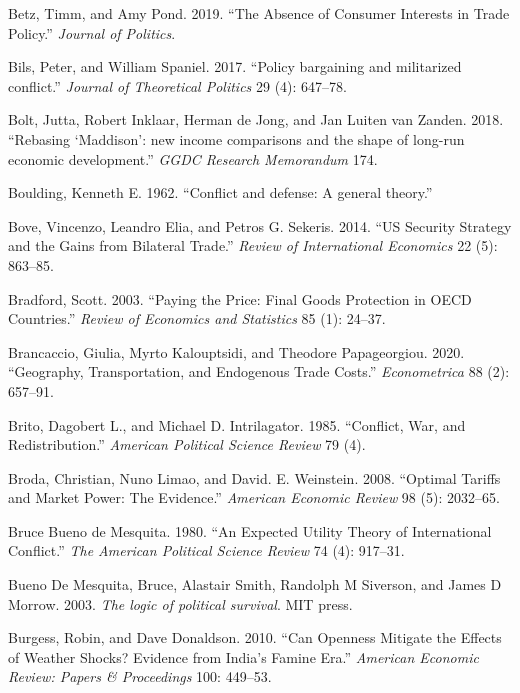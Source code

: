 \documentclass{puthesis}
\newlength{\cslhangindent}
\newenvironment{cslreferences}%
  {\setlength{\parindent}{0pt}%
  \everypar{\setlength{\hangindent}{\cslhangindent}}\ignorespaces}%
  {\par}
\begin{document}
\begin{cslreferences}
\leavevmode\hypertarget{ref-Betz2019}{}%
Betz, Timm, and Amy Pond. 2019. ``The Absence of Consumer Interests in
Trade Policy.'' \emph{Journal of Politics}.

\leavevmode\hypertarget{ref-Bils2017}{}%
Bils, Peter, and William Spaniel. 2017. ``Policy bargaining and
militarized conflict.'' \emph{Journal of Theoretical Politics} 29 (4):
647--78.

\leavevmode\hypertarget{ref-Bolt2018}{}%
Bolt, Jutta, Robert Inklaar, Herman de Jong, and Jan Luiten van Zanden.
2018. ``Rebasing `Maddison': new income comparisons and the shape of
long-run economic development.'' \emph{GGDC Research Memorandum} 174.

\leavevmode\hypertarget{ref-Boulding1962}{}%
Boulding, Kenneth E. 1962. ``Conflict and defense: A general theory.''

\leavevmode\hypertarget{ref-Bove2014}{}%
Bove, Vincenzo, Leandro Elia, and Petros G. Sekeris. 2014. ``US Security
Strategy and the Gains from Bilateral Trade.'' \emph{Review of
International Economics} 22 (5): 863--85.

\leavevmode\hypertarget{ref-Bradford2003}{}%
Bradford, Scott. 2003. ``Paying the Price: Final Goods Protection in
OECD Countries.'' \emph{Review of Economics and Statistics} 85 (1):
24--37.

\leavevmode\hypertarget{ref-Brancaccio2020}{}%
Brancaccio, Giulia, Myrto Kalouptsidi, and Theodore Papageorgiou. 2020.
``Geography, Transportation, and Endogenous Trade Costs.''
\emph{Econometrica} 88 (2): 657--91.

\leavevmode\hypertarget{ref-Brito1985}{}%
Brito, Dagobert L., and Michael D. Intrilagator. 1985. ``Conflict, War,
and Redistribution.'' \emph{American Political Science Review} 79 (4).

\leavevmode\hypertarget{ref-Broda2008}{}%
Broda, Christian, Nuno Limao, and David. E. Weinstein. 2008. ``Optimal
Tariffs and Market Power: The Evidence.'' \emph{American Economic
Review} 98 (5): 2032--65.

\leavevmode\hypertarget{ref-BuenodeMesquita1980}{}%
Bruce Bueno de Mesquita. 1980. ``An Expected Utility Theory of
International Conflict.'' \emph{The American Political Science Review}
74 (4): 917--31.

\leavevmode\hypertarget{ref-BuenodeMesquita2003}{}%
Bueno De Mesquita, Bruce, Alastair Smith, Randolph M Siverson, and James
D Morrow. 2003. \emph{The logic of political survival}. MIT press.

\leavevmode\hypertarget{ref-Burgess2010}{}%
Burgess, Robin, and Dave Donaldson. 2010. ``Can Openness Mitigate the
Effects of Weather Shocks? Evidence from India's Famine Era.''
\emph{American Economic Review: Papers \& Proceedings} 100: 449--53.


\end{cslreferences}
\end{document}
